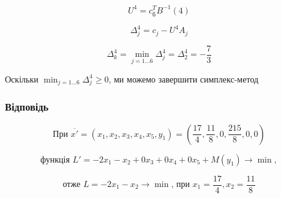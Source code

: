 \documentclass[a4paper, 12pt]{article}
\begin{document}
\begin{equation*}
	U^{4} = c_{\text{б}}^TB^{-1}(4)
\end{equation*}

\begin{equation*}
	\Delta_{j}^{4} = c_j - U^{4}A_{j}
\end{equation*}

\begin{equation*}
	\Delta_k^{4} = \min_{j=1 \dots 6} \Delta_j^{4} = \Delta_2^{4} = -\frac{7}{3}
\end{equation*}

Оскільки $\min_{j=1 \dots 6} \Delta_j^{4} \geqslant 0$, ми можемо завершити симплекс-метод


\subsubsection{Відповідь}


\begin{equation*}
\text{При }\overline{x'} = \left(x_1, x_2, x_3, x_4, x_5, y_1\right) = \left(\frac{17}{4},\frac{11}{8}, 0, \frac{215}{8}, 0, 0\right)
\end{equation*}

\begin{equation*}
\text{функція }L' = -2x_1 - x_2 + 0x_3 + 0x_4 + 0x_5 + M(y_1) \rightarrow \min,
\end{equation*}

\begin{equation*}
\text{отже }L = -2x_1 - x_2 \rightarrow \min \text{, при } x_1 = \frac{17}{4}, x_2 = \frac{11}{8}
\end{equation*}
\end{document}
